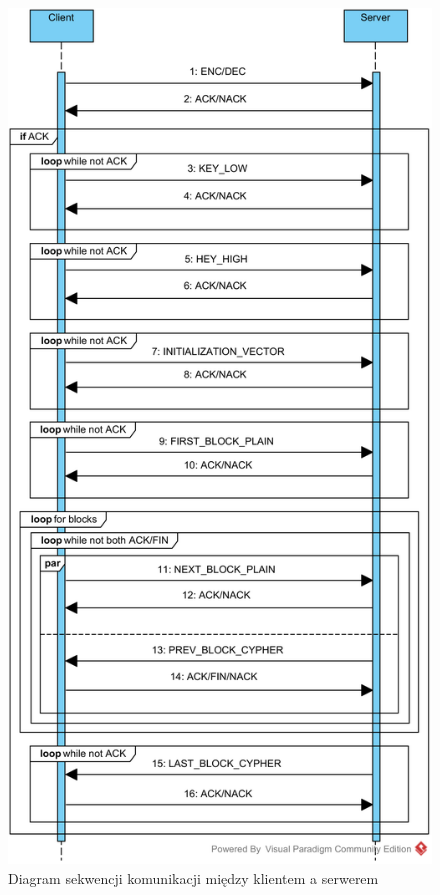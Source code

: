 \begin{figure}
\centering
\includegraphics{pictures/communication-sequence.png}
\caption{Diagram sekwencji komunikacji między klientem a serwerem}
\label{fig:communication-sequence}
\end{figure}

